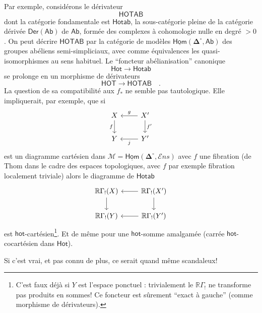 \documentclass[11pt]{article}
\newcommand{\printedpage}[1]{\marginpar{\footnotesize p.~#1}}
\newcommand{\msp}[1]{\marginpar{\footnotesize [#1]}}
\newcommand{\uHom}{\underline{\mathsf{Hom}}}
\newcommand{\Ens}{\mathcal{E}ns}
\newcommand{\bDelta}{\boldsymbol{\Delta}}
\begin{document}
\printedpage{12}
\noindent\msp{page 15}Par exemple, considérons le dérivateur
\[
\mathsf{HOTAB}
\]
dont la catégorie fondamentale est $\mathsf{Hotab}$, la sous-catégorie pleine de la catégorie dérivée $\mathsf{Der}(\mathsf{Ab})$ de $\mathsf{Ab}$, formée des complexes à cohomologie nulle en degré $> 0$. On peut décrire $\mathsf{HOTAB}$ par la catégorie de modèles $\uHom(\bDelta^\circ,\mathsf{Ab})$ des groupes abéliens semi-simpliciaux, avec comme équivalences les quasi-isomorphismes au sens habituel. Le “foncteur abélianisation” canonique
\[
\mathsf{Hot} \longrightarrow \mathsf{Hotab}
\]
se prolonge en un morphisme de dérivateurs
\[
\mathsf{HOT} \longrightarrow \mathsf{HOTAB} \quad .
\]
La question de sa compatibilité aux $f_*$ ne semble pas tautologique. Elle impliquerait, par exemple, que si
\[
\begin{tikzcd}
X \arrow[d, "f"'] & X' \arrow[l, "g"'] \arrow[d, "f'"] \\
Y & Y' \arrow[l, "j"]
\end{tikzcd}
\]
est un diagramme cartésien dans $\mathcal{M} = \uHom(\bDelta^\circ,\Ens)$ avec $f$ une fibration (de Thom dans le cadre des espaces topologiques, avec $f$ par exemple fibration localement triviale) alors le diagramme de $\mathsf{Hotab}$
\[
\begin{tikzcd}
\mathbb{R}\Gamma_!(X) \arrow[d] & \mathbb{R}\Gamma_!(X') \arrow[l] \arrow[d] \\
\mathbb{R}\Gamma_!(Y) & \mathbb{R}\Gamma_!(Y') \arrow[l]
\end{tikzcd}
\]
est $\mathsf{hot}$-cartésien\footnote[7]{C’est faux déjà si $Y$ est l’espace ponctuel : trivialement le $\mathbb{R}\Gamma_!$ ne transforme pas produits en sommes! Ce foncteur est sûrement “exact à gauche” (comme morphisme de dérivateurs).}. Et de même pour une $\mathsf{hot}$-somme amalgamée (carrée $\mathsf{hot}$-cocartésien dans $\mathsf{Hot}$). %

\noindent\msp{page 16}Si c’est vrai, et pas connu de plus, ce serait quand même scandaleux!
\end{document}
